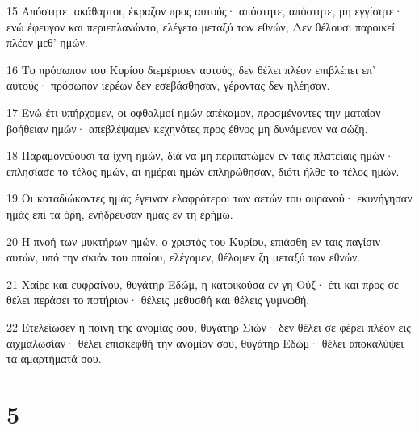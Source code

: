 \par 15 Απόστητε, ακάθαρτοι, έκραζον προς αυτούς· απόστητε, απόστητε, μη εγγίσητε· ενώ έφευγον και περιεπλανώντο, ελέγετο μεταξύ των εθνών, Δεν θέλουσι παροικεί πλέον μεθ' ημών.
\par 16 Το πρόσωπον του Κυρίου διεμέρισεν αυτούς, δεν θέλει πλέον επιβλέπει επ' αυτούς· πρόσωπον ιερέων δεν εσεβάσθησαν, γέροντας δεν ηλέησαν.
\par 17 Ενώ έτι υπήρχομεν, οι οφθαλμοί ημών απέκαμον, προσμένοντες την ματαίαν βοήθειαν ημών· απεβλέψαμεν κεχηνότες προς έθνος μη δυνάμενον να σώζη.
\par 18 Παραμονεύουσι τα ίχνη ημών, διά να μη περιπατώμεν εν ταις πλατείαις ημών· επλησίασε το τέλος ημών, αι ημέραι ημών επληρώθησαν, διότι ήλθε το τέλος ημών.
\par 19 Οι καταδιώκοντες ημάς έγειναν ελαφρότεροι των αετών του ουρανού· εκυνήγησαν ημάς επί τα όρη, ενήδρευσαν ημάς εν τη ερήμω.
\par 20 Η πνοή των μυκτήρων ημών, ο χριστός του Κυρίου, επιάσθη εν ταις παγίσιν αυτών, υπό την σκιάν του οποίου, ελέγομεν, θέλομεν ζη μεταξύ των εθνών.
\par 21 Χαίρε και ευφραίνου, θυγάτηρ Εδώμ, η κατοικούσα εν γη Ούζ· έτι και προς σε θέλει περάσει το ποτήριον· θέλεις μεθυσθή και θέλεις γυμνωθή.
\par 22 Ετελείωσεν η ποινή της ανομίας σου, θυγάτηρ Σιών· δεν θέλει σε φέρει πλέον εις αιχμαλωσίαν· θέλει επισκεφθή την ανομίαν σου, θυγάτηρ Εδώμ· θέλει αποκαλύψει τα αμαρτήματά σου.

\chapter{5}


